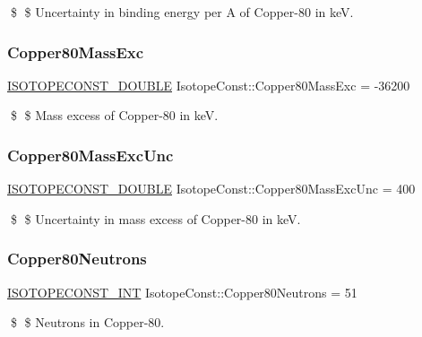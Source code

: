 \$ \$ Uncertainty in binding energy per A of Copper-\/80 in keV. \mbox{\label{group___isotope_const-_copper-_cu80_ga5ed95d333ef901a6bcdd2a31da8341f2}} 
\subsubsection{\texorpdfstring{Copper80\+Mass\+Exc}{Copper80MassExc}}
{\footnotesize\ttfamily \mbox{\hyperlink{group___isotope_const-_macros_ga8f45a7272ce02c0b4c65c44636ed719a}{I\+S\+O\+T\+O\+P\+E\+C\+O\+N\+S\+T\+\_\+\+D\+O\+U\+B\+LE}} Isotope\+Const\+::\+Copper80\+Mass\+Exc = -\/36200}

\$ \$ Mass excess of Copper-\/80 in keV. \mbox{\label{group___isotope_const-_copper-_cu80_ga444d8326a43b1687404833e807f94563}} 
\subsubsection{\texorpdfstring{Copper80\+Mass\+Exc\+Unc}{Copper80MassExcUnc}}
{\footnotesize\ttfamily \mbox{\hyperlink{group___isotope_const-_macros_ga8f45a7272ce02c0b4c65c44636ed719a}{I\+S\+O\+T\+O\+P\+E\+C\+O\+N\+S\+T\+\_\+\+D\+O\+U\+B\+LE}} Isotope\+Const\+::\+Copper80\+Mass\+Exc\+Unc = 400}

\$ \$ Uncertainty in mass excess of Copper-\/80 in keV. \mbox{\label{group___isotope_const-_copper-_cu80_gab0d6753a676e56f24d7fbcdef13fd3b2}} 
\subsubsection{\texorpdfstring{Copper80\+Neutrons}{Copper80Neutrons}}
{\footnotesize\ttfamily \mbox{\hyperlink{group___isotope_const-_macros_ga5f18360b3e99483a35c32d789e62621c}{I\+S\+O\+T\+O\+P\+E\+C\+O\+N\+S\+T\+\_\+\+I\+NT}} Isotope\+Const\+::\+Copper80\+Neutrons = 51}

\$ \$ Neutrons in Copper-\/80. \mbox{\label{group___isotope_const-_copper-_cu80_ga000c2fe4cc4c55c247380f85f624da36}} 

